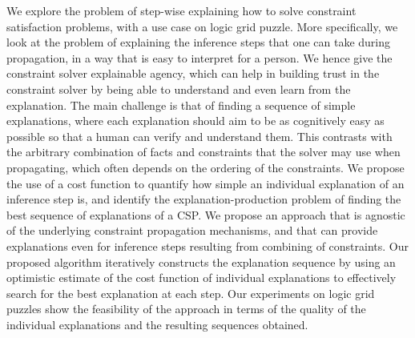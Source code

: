 We explore the problem of step-wise explaining how to solve constraint satisfaction problems, with a use case on logic grid puzzle. More specifically, we look at the problem of explaining the inference steps that one can take during propagation, in a way that is easy to interpret for a person. We hence give the constraint solver explainable agency, which can help in building trust in the constraint solver by being able to understand and even learn from the explanation.
The main challenge is that of finding a sequence of simple explanations, where each explanation should aim to be as cognitively easy as possible so that a human can verify and understand them. This contrasts with the arbitrary combination of facts and constraints that the solver may use when propagating, which often depends on the ordering of the constraints.
We propose the use of a cost function to quantify how simple an individual explanation of an inference step is, and identify the explanation-production problem of finding the best sequence of explanations of a CSP. 
We propose an approach that is agnostic of the underlying constraint propagation mechanisms, and that can provide explanations even for inference steps resulting from combining of constraints.
Our proposed algorithm iteratively constructs the explanation sequence by using an optimistic estimate of the cost function of individual explanations to effectively search for the best explanation at each step.
Our experiments on logic grid puzzles show the feasibility of the approach in terms of the quality of the individual explanations and the resulting sequences obtained.
